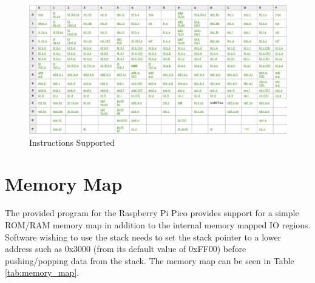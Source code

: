 \documentclass[10pt]{article}
\begin{document}
\begin{figure}[h]
	\begin{minipage}{\textwidth}
		\includegraphics[width=\textwidth]{instructions.png}
		\caption{Instructions Supported}
		\label{fig:instruction_set}
	\end{minipage}
\end{figure}

\section{Memory Map}

The provided program for the Raspberry Pi Pico provides support for a simple ROM/RAM memory map in
addition to the internal memory mapped IO regions. Software wishing to use the stack needs to set
the stack pointer to a lower address such as 0x3000 (from its default value of 0xFF00) before
pushing/popping data from the stack. The memory map can be seen in Table \ref{tab:memory_map}.
\end{document}
